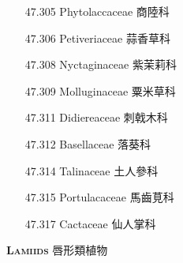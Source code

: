 \begin{enumerate}
\begin{enumerate}
      \item[47.305] Phytolaccaceae 商陸科     
        
      \item[47.306] Petiveriaceae 蒜香草科     
        
      \item[47.308] Nyctaginaceae 紫茉莉科     
        
      \item[47.309] Molluginaceae 粟米草科     
        
      \item[47.311] Didiereaceae 刺戟木科     
        
      \item[47.312] Basellaceae 落葵科     
        
      \item[47.314] Talinaceae 土人參科     
        
      \item[47.315] Portulacaceae 馬齒莧科     
        
      \item[47.317] Cactaceae 仙人掌科     
        
    \end{enumerate}
\end{enumerate}
\vspace{2ex} 
\noindent \normalsize\textsc{\textbf{Lamiids} 唇形類植物}\selectfont \\
\footnotesize\selectfont
